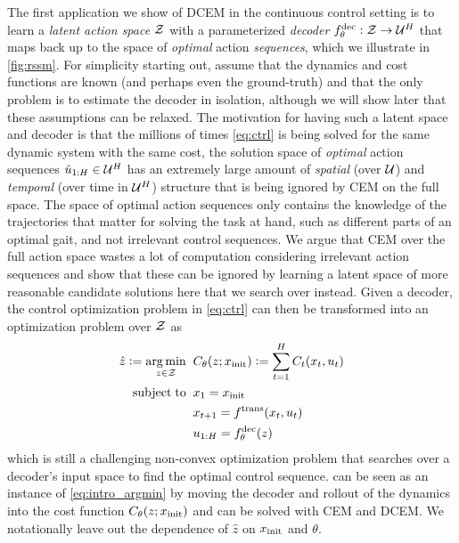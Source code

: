 \documentclass{article}
\begin{document}
The first application we show of DCEM in the continuous control
setting is to learn a \emph{latent action space} ${\mathcal{Z}}$
with a parameterized \emph{decoder} $f^{\mathrm{dec}}_\theta: {\mathcal{Z}}\rightarrow{\mathcal{U}}^H$
that maps back up to the space of \emph{optimal} action \emph{sequences},
which we illustrate in \cref{fig:rssm}.
For simplicity starting out, assume that the dynamics and cost
functions are known (and perhaps even the ground-truth)
and that the only problem is to estimate the decoder in isolation,
although we will show later that these assumptions can be relaxed.
The motivation for having such a latent space and decoder is
that the millions of times \cref{eq:ctrl} is being solved
for the same dynamic system with the same cost,
the solution space of \emph{optimal} action sequences
$\hat u_{1:H}\in{\mathcal{U}}^H$
has an extremely large amount of \emph{spatial} (over ${\mathcal{U}}$)
and \emph{temporal} (over time in ${\mathcal{U}}^H$) structure that
is being ignored by CEM on the full space.
The space of optimal action sequences only contains the
knowledge of the trajectories that matter for solving the
task at hand, such as different parts of an optimal gait,
and not irrelevant control sequences.
We argue that CEM over the full action space wastes a lot
of computation considering irrelevant action sequences and
show that these can be ignored by learning a latent space
of more reasonable candidate solutions here that
we search over instead.
Given a decoder, the control optimization problem in
\cref{eq:ctrl} can then be transformed into an optimization
problem over ${\mathcal{Z}}$ as
\begin{equation}
  \begin{split}
    \hat z \vcentcolon= \operatorname*{arg\,min}_{z\in {\mathcal{Z}}} \;\; & C_\theta(z; x_{\rm init}) \vcentcolon=\sum_{t=1}^H  C_{t}(x_t, u_t) \\
    \;\; \operatorname*{subject\;to} \;\; & x_1 = x_{\rm init} \\
    & x_{t+1} = f^{\mathrm{trans}}(x_t, u_t) \\
    & u_{1:H}=f^{\mathrm{dec}}_\theta(z)
  \end{split}
  \label{eq:emb_ctrl}
\end{equation}
which is still a challenging non-convex optimization problem
that searches over a decoder's input space to find the
optimal control sequence.
 can be seen as an instance of
\cref{eq:intro_argmin} by moving the decoder and
rollout of the dynamics into the cost function $C_\theta(z; x_{\rm init})$
and can be solved with CEM and DCEM.
We notationally leave out the dependence of $\hat z$
on $x_{\rm init}$ and $\theta$.
\end{document}
